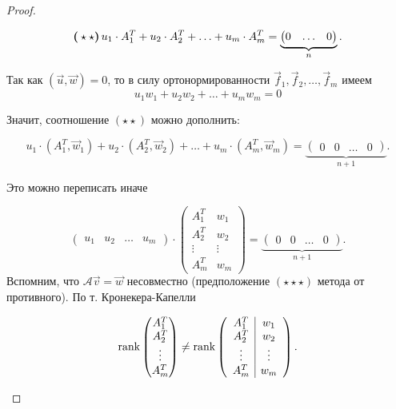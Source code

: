\begin{proof}
\begin{description}
        $$\textbf{(}\star\star\textbf{)} \thinspace u_1 \cdot A^T_1 + u_2 \cdot A^T_2 + \ldots + u_m \cdot A^T_m = \underbrace{\begin{pmatrix}
             0 & \ldots & 0
         \end{pmatrix}}_{n}.$$

         Так как $(\vec{u}, \vec{w}) = 0$, то в силу ортонормированности $\vec{f}_1, \vec{f}_2, \ldots, \vec{f}_m$ имеем
         $$u_1w_1 + u_2w_2 + \ldots + u_mw_m = 0$$

         Значит, соотношение \textbf{$(\star \star)$} можно дополнить:

         $$u_1\cdot(A^T_1, \vec{w}_1) + u_2\cdot(A^T_2, \vec{w}_2) + \ldots + u_m\cdot(A^T_m, \vec{w}_m) = \underbrace{\begin{pmatrix}
             0 & 0 & \ldots & 0
         \end{pmatrix}}_{n + 1}.$$

         Это можно переписать иначе

         $$\begin{pmatrix}
                u_1 & u_2 & \ldots & u_m
            \end{pmatrix}
            \cdot
            \left(
                \begin{array}{c|c}
                    A_1^T & w_1 \\
                    A_2^T & w_2 \\
                    \vdots & \vdots \\
                    A_m^T & w_m
                \end{array}
            \right)
            =
            \underbrace{
                \begin{pmatrix}
                    0 & 0 & \ldots & 0
                \end{pmatrix}
            }_{n + 1}.$$
            Вспомним, что $\mathscr{A}\vec{v} = \vec{w}$ несовместно (предположение \textbf{$(\star\star\star)$} метода от противного). По т. Кронекера-Капелли 

            $$\operatorname{\mathop{\mathrm{rank}}}\begin{pmatrix}
                    A^T_1 \\ 
                    A^T_2 \\ 
                    \vdots \\
                    A^T_m
                \end{pmatrix} \ne \operatorname{\mathop{\mathrm{rank}}} \left(
                \begin{array}{c|c}
                    A_1^T & w_1 \\
                    A_2^T & w_2 \\
                    \vdots & \vdots \\
                    A_m^T & w_m
                \end{array}
            \right).$$


\end{description}
\end{proof}
